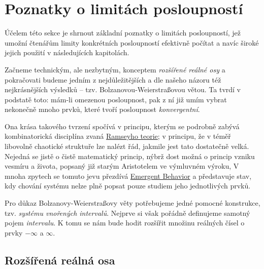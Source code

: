 \section{Poznatky o limitách posloupností}
\label{sec:poznatky-o-limitach-posloupnosti}

Účelem této sekce je shrnout základní poznatky o limitách posloupností, jež
umožní čtenářům limity konkrétních posloupností efektivně počítat a navíc
široké jejich použití v následujících kapitolách.

Začneme technickým, ale nezbytným, konceptem \emph{rozšířené reálné osy} a
pokračovati budeme jedním z nejdůležitějších a dle našeho názoru též
nejkrásnějších výsledků -- tzv. Bolzano\-vou-Weierstraßo\-vou větou. Ta tvrdí v
podstatě toto: mám-li omezenou posloupnost, pak z ní již umím vybrat nekonečně
mnoho prvků, které tvoří posloupnost \emph{konvergentní}.

Ona krása takového tvrzení spočívá v principu, kterým se podrobně zabývá
kombinatorická disciplína zvaná
\href{https://en.wikipedia.org/wiki/Ramsey_theory}{Ramseyho teorie}; v principu,
že v téměř libovolně chaotické struktuře lze nalézt řád, jakmile jest tato
dostatečně velká. Nejedná se jistě o čistě matematický princip, nýbrž dost možná
o princip vzniku vesmíru a života, popsaný již starým Aristotelem ve výmluvném
výroku,  V mnoha zpytech se tomuto
jevu přezdívá
\href{https://www.sciencedirect.com/topics/computer-science/emergent-behavior}{Emergent
Behavior} a představuje stav, kdy chování systému nelze plně popsat pouze
studiem jeho jednotlivých prvků.

Pro důkaz Bolzanovy-Weierstraßovy věty potřebujeme jedné pomocné konstrukce,
tzv. \emph{systému vnořených intervalů}. Nejprve si však pořádně definujeme
samotný pojem \emph{intervalu}. K tomu se nám bude hodit rozšířit množinu
reálných čísel o prvky $-\infty$ a $\infty$.

\subsection{Rozšířená reálná osa}
\label{ssec:rozsirena-realna-osa}

